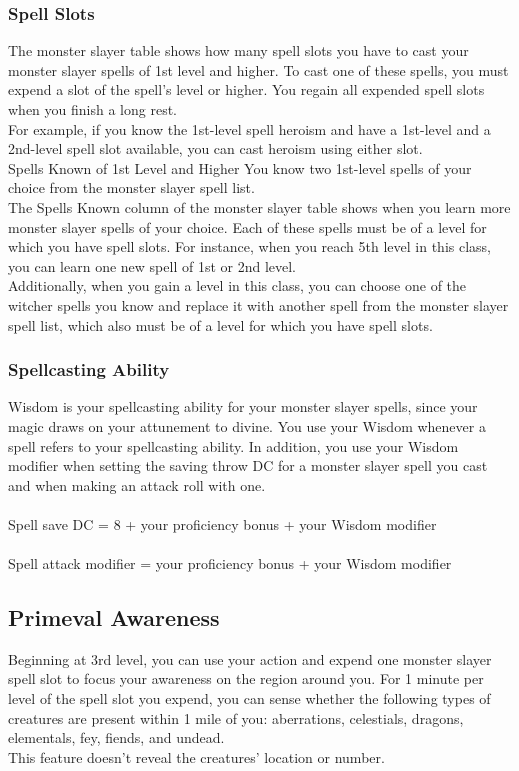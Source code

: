 \documentclass[11pt,a4paper,twocolumn, sans]{article}
\begin{document}
	\subsubsection*{Spell Slots}
	The monster slayer table shows how many spell slots you have to cast your monster slayer spells of 1st level and higher. To cast one of these spells, you must expend a slot of the spell’s level or higher. You regain all expended spell slots when you finish a long rest. \\
	For example, if you know the 1st-level spell heroism and have a 1st-level and a
	2nd-level spell slot available, you can cast heroism using either slot. \\
	Spells Known of 1st Level and Higher You know two 1st-level spells of your choice
	from the monster slayer spell list. \\
	The Spells Known column of the monster slayer table shows when you learn more monster slayer spells of your choice. Each of these spells must be of a	level for which you have spell slots. For instance, when you reach 5th level in this class, you can learn one new spell of 1st or 2nd level. \\
	Additionally, when you gain a level in this class, you can choose one of the witcher spells you know and replace it with another spell from the monster slayer spell list, which also must be of a level for which you have spell slots.
	\subsubsection*{Spellcasting Ability}
	Wisdom is your spellcasting ability for your monster slayer spells, since your magic draws on your attunement to divine. You use your Wisdom whenever a spell refers to your spellcasting ability. In addition, you use your Wisdom modifier when setting the saving throw DC for a monster slayer spell you cast and when making an attack roll with one. \\
	\\
	Spell save DC = 8 + your proficiency bonus + your Wisdom modifier \\
	\\
	Spell attack modifier = your proficiency bonus + your Wisdom modifier \\
	
	\subsection*{Primeval Awareness}
	Beginning at 3rd level, you can use your action and expend one monster slayer spell slot to focus your awareness on the region around you. For 1 minute per level of the spell slot you expend, you can sense whether the following types of
	creatures are present within 1 mile of you: aberrations, celestials, dragons,
	elementals, fey, fiends, and undead. \\
	This feature doesn’t reveal the creatures’ location or number. 
	
\end{document}
